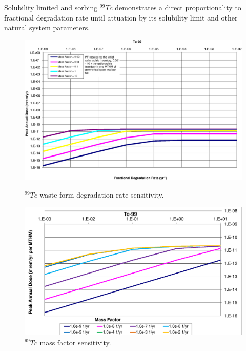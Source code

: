 Solubility limited and sorbing $^{99}Tc$ demonstrates a direct proportionality 
to fractional degradation rate until attuation by its solubility limit and other 
natural system parameters.  

\begin{figure}[ht!]
\begin{minipage}[b]{0.45\linewidth}

\centering
\includegraphics[width=\linewidth]{./chapters/nuclide_sensitivity/clay/WFDegAndInv/Tc-99.eps}
\caption{$^{99}Tc$ waste form degradation rate sensitivity.}
\label{fig:WFDegTc99}

\end{minipage}
\hspace{0.05\linewidth}
\begin{minipage}[b]{0.45\linewidth}

\includegraphics[width=\linewidth]{./chapters/nuclide_sensitivity/clay/WFDegAndInv/Tc-99-MF.eps}
\caption{$^{99}Tc$ mass factor sensitivity.}
\label{fig:WFDegTc99MF}

\end{minipage}
\end{figure}
